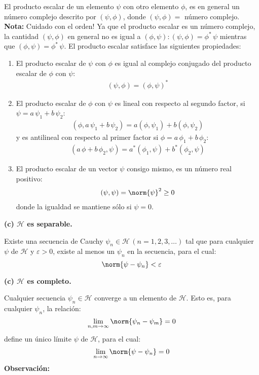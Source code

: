 El producto escalar de un elemento $\psi$ con otro elemento $\phi$, es en general un número complejo descrito por $(\psi, \phi)$, donde $(\psi, \phi) =$ número complejo. \textbf{Nota: } Cuidado con el orden! Ya que el producto escalar es un número complejo, la cantidad  $(\psi, \phi)$ en general no es igual a  $(\phi, \psi) : (\psi, \phi) = \phi^{*} \, \psi$ mientras que $(\phi, \psi) = \phi^{*} \, \psi$. El producto escalar satisface las siguientes propiedades:
\begin{enumerate}[label=\roman*)]
\item El producto escalar de $\psi$ con $\phi$ es igual al complejo conjugado del producto escalar de $\phi$ con $\psi$:
\begin{align}
(\psi, \phi) = (\phi, \psi)^{*}
\label{eq:ecuacion_02_04}
\end{align}
\item El producto escalar de $\phi$ con $\psi$ es lineal con respecto al segundo factor, si $\psi = a \, \psi_{1} + b \, \psi_{2}$:
\begin{align}
(\phi, a \, \psi_{1} + b \, \psi_{2} ) = a (\phi, \psi_{1}) + b (\phi, \psi_{2})
\label{eq:ecuacion_02_05}
\end{align}
y es antilineal con respecto al primer factor si $\phi = a \, \phi_{1} + b \, \phi_{2}$:
\begin{align}
(a \, \phi + b \, \phi_{2}, \psi) = a^{*} (\phi_{1}, \psi) + b^{*} (\phi_{2}, \psi)
\label{eq:ecuacion_02_06}
\end{align}
\item El producto escalar de un vector $\psi$ consigo mismo, es un número real positivo:
\begin{align}
(\psi, \psi) = \norm{\psi}^{2} \geq 0
\label{eq:ecuacion_02_07}
\end{align}
donde la igualdad se mantiene sólo si $\psi = 0$.
\end{enumerate}
\textbf{(c) $\mathcal{H}$ es separable.}

Existe una secuencia de Cauchy $\psi_{n} \in \mathcal{H} \, (n = 1, 2, 3, \ldots)$ tal que para cualquier $\psi$ de $\mathcal{H}$ y $\varepsilon > 0$, existe al menos un $\psi_{n}$ en la secuencia, para el cual:
\begin{equation}
\norm{ \psi - \psi_{n}} < \varepsilon
\label{eq:ecuacion_02_08}
\end{equation}

\textbf{(c) $\mathcal{H}$ es completo.}

Cualquier secuencia $\psi_{n} \in \mathcal{H}$ converge a un elemento de $\mathcal{H}$. Esto es, para cualquier $\psi_{n}$, la relación:
\begin{equation}
\lim_{n, m \to \infty} \norm{\psi_{n} - \psi_{m}} = 0
\label{eq:ecuacion_02_09}
\end{equation}
define un único límite $\psi$ de $\mathcal{H}$, para el cual:
\begin{equation}
\lim_{n \to \infty} \norm{\psi - \psi_{n}} = 0
\label{eq:ecuacion_02_10}
\end{equation}
\textbf{Observación:}

